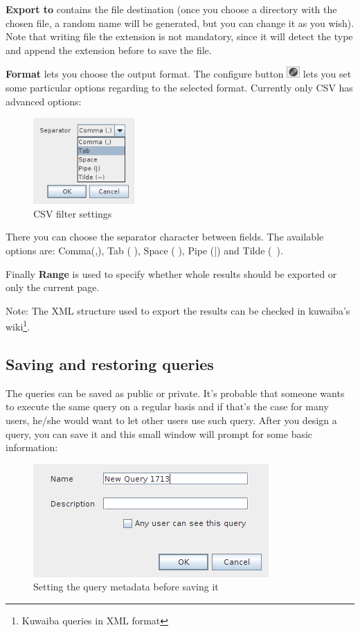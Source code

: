 \documentclass[a4paper]{article}
\begin{document}
	\textbf{Export to} contains the file destination (once you choose a directory with the chosen file, a random name will be generated, but you can change it as you wish). Note that writing file the extension is not mandatory, since it will detect the type and append the extension before to save the file.  
	
	\textbf{Format} lets you choose the output format. The configure button \includegraphics[width=0.5cm]{img/icon_edit_saved_query.png} lets you set some particular options regarding to the selected format. Currently only CSV has advanced options:		
	\begin{figure}[h!]
		\centering
		\includegraphics[width=0.3\linewidth]{img/query_exports_settings.png}
		\caption{CSV filter settings}
		\label{fig:query_exports_settings}
	\end{figure}
	
	There you can choose the separator character between fields. The available options are: Comma(,), Tab (	), Space ( ), Pipe (|) and Tilde (~).
	
	Finally \textbf{Range} is used to specify whether whole results should be exported or only the current page.
	
	Note: The XML structure used to export the results can be checked in kuwaiba's wiki\footnote{Kuwaiba queries in XML format }.
	
	\subsection{Saving and restoring queries}
	The queries can be saved as public or private. It's probable that someone wants to execute the same query on a regular basis and if that's the case for many users, he/she would want to let other users use such query. After you design a query, you can save it and this small window will prompt for some basic information:
	\begin{figure}[h!]
		\centering
		\includegraphics[width=0.5\linewidth]{img/query_save_menu.png}
		\caption{Setting the query metadata before saving it}
		\label{fig:query_save_menu}
	\end{figure}
	
\end{document}

